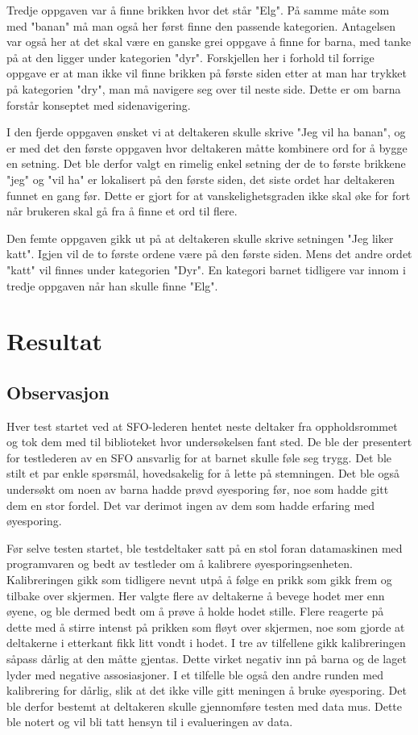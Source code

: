 Tredje oppgaven var å finne brikken hvor det står "Elg". På samme måte som med "banan" må man også her først finne den passende kategorien. Antagelsen var også her at det skal være en ganske grei oppgave å finne for barna, med tanke på at den ligger under kategorien "dyr". Forskjellen her i forhold til forrige oppgave er at man ikke vil finne brikken på første siden etter at man har trykket på kategorien "dry", man må navigere seg over til neste side. Dette er om barna forstår konseptet med sidenavigering.
 
I den fjerde oppgaven ønsket vi at deltakeren skulle skrive "Jeg vil ha banan", og er med det den første oppgaven hvor deltakeren måtte kombinere ord for å bygge en setning. Det ble derfor valgt en rimelig enkel setning der de to første brikkene "jeg" og "vil ha" er lokalisert på den første siden, det siste ordet har deltakeren funnet en gang før. Dette er gjort for at vanskelighetsgraden ikke skal øke for fort når brukeren skal gå fra å finne et ord til flere.
 
Den femte oppgaven gikk ut på at deltakeren skulle skrive setningen "Jeg liker katt". Igjen vil de to første ordene være på den første siden. Mens det andre ordet "katt" vil finnes under kategorien "Dyr". En kategori barnet tidligere var innom i tredje oppgaven når han skulle finne "Elg". 
 
 
\section{Resultat} 
 
\subsection{Observasjon} 
 
Hver test startet ved at SFO-lederen hentet neste deltaker fra oppholdsrommet og tok dem med til biblioteket hvor undersøkelsen fant sted. De ble der presentert for testlederen av en SFO ansvarlig for at barnet skulle føle seg trygg. Det ble stilt et par enkle spørsmål, hovedsakelig for å lette på stemningen. Det ble også undersøkt om noen av barna hadde prøvd øyesporing før, noe som hadde gitt dem en stor fordel. Det var derimot ingen av dem som hadde erfaring med øyesporing. 
 
 
Før selve testen startet, ble testdeltaker satt på en stol foran datamaskinen med programvaren og bedt av testleder om å kalibrere øyesporingsenheten. Kalibreringen gikk som tidligere nevnt utpå å følge en prikk som gikk frem og tilbake over skjermen. Her valgte flere av deltakerne å bevege hodet mer enn øyene, og ble dermed bedt om å prøve å holde hodet stille. Flere reagerte på dette med å stirre intenst på prikken som fløyt over skjermen, noe som gjorde at deltakerne i etterkant fikk litt vondt i hodet. I tre av tilfellene gikk kalibreringen såpass dårlig at den måtte gjentas. Dette virket negativ inn på barna og de laget lyder med negative assosiasjoner. I et tilfelle ble også den andre runden med kalibrering for dårlig, slik at det ikke ville gitt meningen å bruke øyesporing. Det ble derfor bestemt at deltakeren skulle gjennomføre testen med data mus. Dette ble notert og vil bli tatt hensyn til i evalueringen av data. 
 
